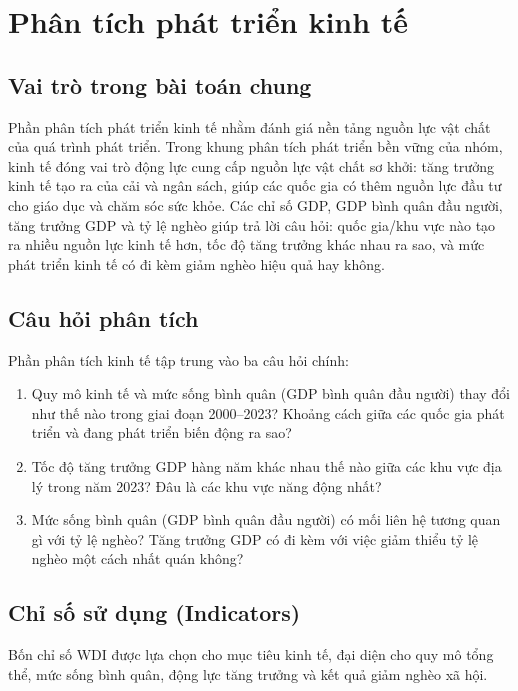 \section{Phân tích phát triển kinh tế}

\subsection{Vai trò trong bài toán chung}

Phần phân tích phát triển kinh tế nhằm đánh giá nền tảng nguồn lực vật chất của quá trình phát triển. Trong khung phân tích phát triển bền vững của nhóm, kinh tế đóng vai trò động lực cung cấp nguồn lực vật chất sơ khởi: tăng trưởng kinh tế tạo ra của cải và ngân sách, giúp các quốc gia có thêm nguồn lực đầu tư cho giáo dục và chăm sóc sức khỏe. Các chỉ số GDP, GDP bình quân đầu người, tăng trưởng GDP và tỷ lệ nghèo giúp trả lời câu hỏi: quốc gia/khu vực nào tạo ra nhiều nguồn lực kinh tế hơn, tốc độ tăng trưởng khác nhau ra sao, và mức phát triển kinh tế có đi kèm giảm nghèo hiệu quả hay không.

\subsection{Câu hỏi phân tích}

Phần phân tích kinh tế tập trung vào ba câu hỏi chính:
\begin{enumerate}
    \item Quy mô kinh tế và mức sống bình quân (GDP bình quân đầu người) thay đổi như thế nào trong giai đoạn 2000--2023? Khoảng cách giữa các quốc gia phát triển và đang phát triển biến động ra sao?
    \item Tốc độ tăng trưởng GDP hàng năm khác nhau thế nào giữa các khu vực địa lý trong năm 2023? Đâu là các khu vực năng động nhất?
    \item Mức sống bình quân (GDP bình quân đầu người) có mối liên hệ tương quan gì với tỷ lệ nghèo? Tăng trưởng GDP có đi kèm với việc giảm thiểu tỷ lệ nghèo một cách nhất quán không?
\end{enumerate}

\subsection{Chỉ số sử dụng (Indicators)}

Bốn chỉ số WDI được lựa chọn cho mục tiêu kinh tế, đại diện cho quy mô tổng thể, mức sống bình quân, động lực tăng trưởng và kết quả giảm nghèo xã hội.

